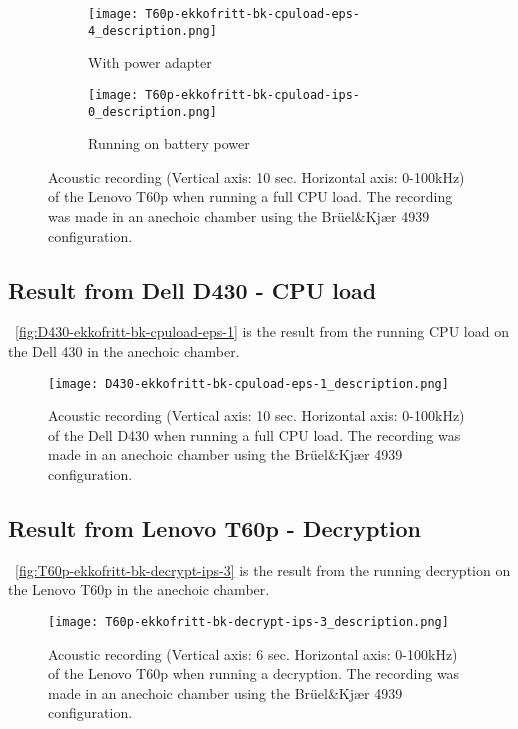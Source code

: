 \begin{figure}[ht]
	\begin{subfigure}{1\textwidth}
	    \centering
	    \texttt{[image: T60p-ekkofritt-bk-cpuload-eps-4\_description.png]}
	    \caption{With power adapter}
	    \label{fig:T60p-ekkofritt-bk-cpuload-eps-4}
    \end{subfigure}
    \begin{subfigure}{1\textwidth}
	    \centering
	    \texttt{[image: T60p-ekkofritt-bk-cpuload-ips-0\_description.png]}
	    \caption{Running on battery power}
	    \label{fig:T60p-ekkofritt-bk-cpuload-ips-0}
    \end{subfigure}
    \caption{Acoustic recording (Vertical axis: 10 sec. Horizontal axis: 0-100kHz) of the Lenovo T60p when running a full CPU load. The recording was made in an anechoic chamber using the Brüel\&Kjær 4939 configuration.}
	\label{fig:T60p-ekkofritt-bk-cpuload}
\end{figure}


\subsection{Result from Dell D430 - CPU load}\label{chp5:subsec:d430_bk_results_cpuload}

~\autoref{fig:D430-ekkofritt-bk-cpuload-eps-1} is the result from the running CPU load on the Dell 430 in the anechoic chamber. 
\begin{figure}[ht]
    \centering
    \texttt{[image: D430-ekkofritt-bk-cpuload-eps-1\_description.png]}
    \caption{Acoustic recording (Vertical axis: 10 sec. Horizontal axis: 0-100kHz) of the Dell D430 when running a full CPU load. The recording was made in an anechoic chamber using the Brüel\&Kjær 4939 configuration. }
    \label{fig:D430-ekkofritt-bk-cpuload-eps-1}
\end{figure}


\subsection{Result from Lenovo T60p - Decryption}\label{chp5:subsec:t60p_bk_results_decryption}

~\autoref{fig:T60p-ekkofritt-bk-decrypt-ips-3} is the result from the running decryption on the Lenovo T60p in the anechoic chamber. 
\begin{figure}[ht]
    \centering
    \texttt{[image: T60p-ekkofritt-bk-decrypt-ips-3\_description.png]}
    \caption{Acoustic recording (Vertical axis: 6 sec. Horizontal axis: 0-100kHz) of the Lenovo T60p when running a decryption. The recording was made in an anechoic chamber using the Brüel\&Kjær 4939 configuration. }
    \label{fig:T60p-ekkofritt-bk-decrypt-ips-3}
\end{figure}

